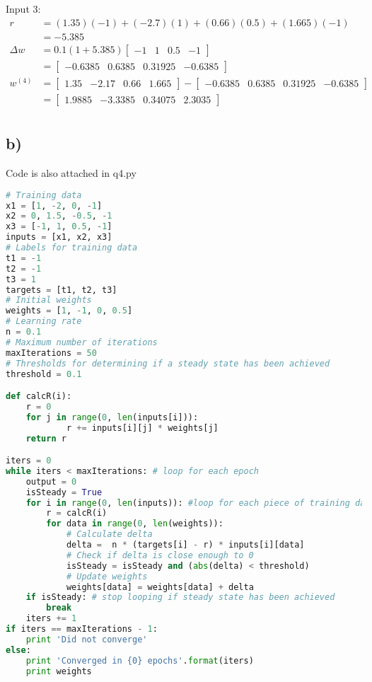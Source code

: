 \documentclass[12pt,a4paper]{article}
\begin{document}
Input 3:
\begin{align*}
	r &= (1.35)(-1) + (-2.7)(1) + (0.66)(0.5) + (1.665)(-1)\\
	&= −5.385\\
	\Delta w &= 0.1(1+5.385)\begin{bmatrix}
		-1 & 1 & 0.5 & -1
	\end{bmatrix}\\
	&= \begin{bmatrix}
		-0.6385 & 0.6385 & 0.31925 & -0.6385
	\end{bmatrix}\\
	w^{(4)} &=
	\begin{bmatrix}
		1.35 & -2.17 & 0.66 & 1.665
	\end{bmatrix} -
\begin{bmatrix}
		-0.6385 & 0.6385 & 0.31925 & -0.6385
	\end{bmatrix}\\
	&=
	\begin{bmatrix}
		1.9885 & −3.3385 & 0.34075 & 2.3035
	\end{bmatrix}\\
\end{align*}

\subsection*{b)}
\label{sub:b_}
Code is also attached in q4.py

\begin{lstlisting}[language=python]
# Training data
x1 = [1, -2, 0, -1]
x2 = 0, 1.5, -0.5, -1
x3 = [-1, 1, 0.5, -1]
inputs = [x1, x2, x3]
# Labels for training data
t1 = -1
t2 = -1
t3 = 1
targets = [t1, t2, t3]
# Initial weights
weights = [1, -1, 0, 0.5]
# Learning rate
n = 0.1
# Maximum number of iterations
maxIterations = 50
# Thresholds for determining if a steady state has been achieved
threshold = 0.1

def calcR(i):
    r = 0
    for j in range(0, len(inputs[i])):
            r += inputs[i][j] * weights[j]
    return r

iters = 0
while iters < maxIterations: # loop for each epoch
    output = 0
    isSteady = True
    for i in range(0, len(inputs)): #loop for each piece of training data
        r = calcR(i)
        for data in range(0, len(weights)):
            # Calculate delta
            delta =  n * (targets[i] - r) * inputs[i][data]
            # Check if delta is close enough to 0
            isSteady = isSteady and (abs(delta) < threshold)
            # Update weights
            weights[data] = weights[data] + delta
    if isSteady: # stop looping if steady state has been achieved
        break
    iters += 1
if iters == maxIterations - 1:
    print 'Did not converge'
else:
    print 'Converged in {0} epochs'.format(iters)
    print weights
\end{lstlisting}
\end{document}
